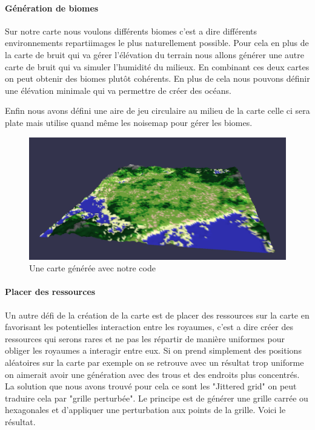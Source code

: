     \paragraph{Génération de biomes}
    Sur notre carte nous voulons différents biomes c'est a dire différents environnements repartiimages le plus naturellement possible. Pour cela en plus de la carte de bruit qui va gérer l'élévation du terrain nous allons générer une autre carte de bruit qui va simuler l’humidité du milieux. En combinant ces deux cartes on peut obtenir des biomes plutôt cohérents. En plus de cela nous pouvons définir une élévation minimale qui va permettre de créer des océans.

    Enfin nous avons défini une aire de jeu circulaire au milieu de la carte celle ci sera plate mais utilise quand même les noisemap pour gérer les biomes.


    \begin{figure}[!h]
        \centering
        \includegraphics[width=0.5\linewidth]{images/map.png}
        \caption{Une carte générée avec notre code}
        \label{fig:enter-label}
    \end{figure}

    \paragraph{Placer des ressources}
    Un autre défi de la création de la carte est de placer des ressources sur la carte en favorisant les potentielles interaction entre les royaumes, c'est a dire créer des ressources qui serons rares et ne pas les répartir de manière uniformes pour obliger les royaumes a interagir entre eux. Si on prend simplement des positions aléatoires sur la carte par exemple on se retrouve avec un résultat trop uniforme on aimerait avoir une génération avec des trous et des endroits plus concentrés. La solution que nous avons trouvé pour cela ce sont les "Jittered grid" on peut traduire cela par "grille perturbée". Le principe est de générer une grille carrée ou hexagonales et d'appliquer une perturbation aux points de la grille. Voici le résultat.

